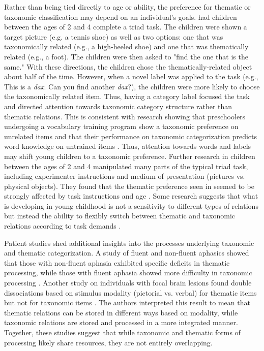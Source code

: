 \documentclass[../dissertation.tex]{subfiles}
\begin{document}
	Rather than being tied directly to age or ability, the preference for thematic or taxonomic classification may depend on an individual's goals. \citet{Markman1984} had children between the ages of 2 and 4 complete a triad task. The children were shown a target picture (e.g. a tennis shoe) as well as two options: one that was taxonomically related (e.g., a high-heeled shoe) and one that was thematically related (e.g., a foot). The children were then asked to "find the one that is the same." With these directions, the children chose the thematically-related object about half of the time. However, when a novel label was applied to the task (e.g., This is a \textit{dax}. Can you find another \textit{dax}?), the children were more likely to choose the taxonomically related item. Thus, having a category label focused the task and directed attention towards taxonomic category structure rather than thematic relations. This is consistent with research showing that preschoolers undergoing a vocabulary training program show a taxonomic preference on unrelated items and that their performance on taxonomic categorization predicts word knowledge on untrained items \citep{Kaefer2013}. Thus, attention towards words and labels may shift young children to a taxonomic preference. Further research in children between the ages of 2 and 4 manipulated many parts of the typical triad task, including experimenter instructions and medium of presentation (pictures vs. physical objects). They found that the thematic preference seen in \citet{Smiley1979} seemed to be strongly affected by task instructions and age \citep{Waxman1997}. Some research suggests that what is developing in young childhood is not a sensitivity to different types of relations but instead the ability to flexibly switch between thematic and taxonomic relations according to task demands \citep{Blaye2001}. \par
	Patient studies shed additional insights into the processes underlying taxonomic and thematic categorization. A study of fluent and non-fluent aphasics showed that those with non-fluent aphasia exhibited specific deficits in thematic processing, while those with fluent aphasia showed more difficulty in taxonomic processing \citep{Vivas2016}. Another study on individuals with focal brain lesions found double dissociations based on stimulus modality (pictorial vs. verbal) for thematic items but not for taxonomic items \citep{Vivas2014}. The authors interpreted this result to mean that thematic relations can be stored in different ways based on modality, while taxonomic relations are stored and processed in a more integrated manner. Together, these studies suggest that while taxonomic and thematic forms of processing likely share resources, they are not entirely overlapping. \par
\end{document}
